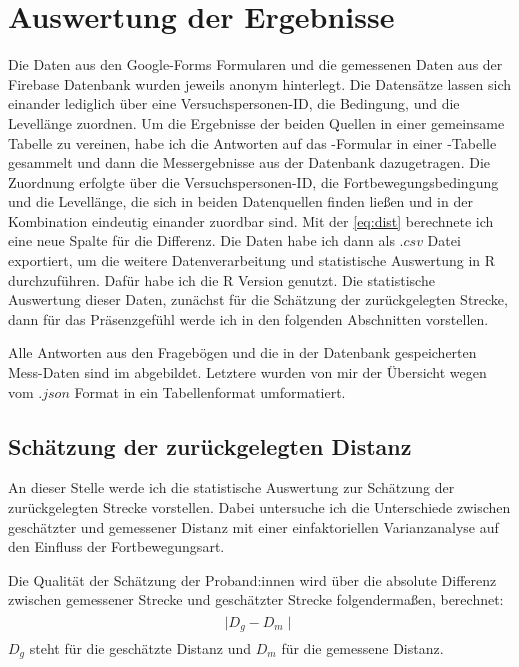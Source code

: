 
        \section{Auswertung der Ergebnisse}
            Die Daten aus den Google-Forms Formularen und die gemessenen Daten aus der Firebase Datenbank wurden jeweils anonym hinterlegt. Die Datensätze lassen sich einander lediglich über eine Versuchspersonen-ID, die Bedingung, und die Levellänge
            zuordnen.
            Um die Ergebnisse der beiden Quellen in einer gemeinsame Tabelle zu vereinen, habe ich die Antworten auf das -Formular in einer -Tabelle gesammelt und dann die Messergebnisse aus der Datenbank dazugetragen. Die Zuordnung erfolgte über die Versuchspersonen-ID, die Fortbewegungsbedingung und die Levellänge, die sich in beiden Datenquellen finden ließen und in der Kombination eindeutig einander zuordbar sind.
            Mit der \autoref{eq:dist}
            berechnete ich eine neue Spalte für die Differenz. Die Daten habe ich dann als $.csv$ Datei exportiert, um die weitere Datenverarbeitung und statistische Auswertung in R durchzuführen. Dafür habe ich die R Version  genutzt. Die statistische Auswertung dieser Daten, zunächst für die Schätzung der zurückgelegten Strecke, dann für das Präsenzgefühl werde ich in den folgenden Abschnitten vorstellen.

            Alle Antworten aus den Fragebögen und die in der Datenbank gespeicherten Mess-Daten sind im  abgebildet. Letztere wurden von mir der Übersicht wegen vom $.json$ Format in ein Tabellenformat umformatiert.

                \subsection{Schätzung der zurückgelegten Distanz}
                    An dieser Stelle werde ich die statistische Auswertung zur Schätzung der zurückgelegten Strecke vorstellen.
                    Dabei untersuche ich die Unterschiede zwischen geschätzter und gemessener Distanz mit einer einfaktoriellen Varianzanalyse auf den Einfluss der Fortbewegungsart.

                    Die Qualität der Schätzung der Proband:innen wird über die absolute Differenz zwischen gemessener Strecke und geschätzter Strecke folgendermaßen, berechnet:
                    \begin{align}
                        \begin{split}
                            \mid D_g - D_m \mid \label{eq:dist} %
                        \end{split}
                    \end{align}
                    $D_g$ steht für die geschätzte Distanz und $D_m$ für die gemessene Distanz.

